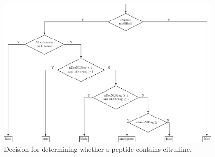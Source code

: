 \documentclass[12pt]{article}
\begin{document}
	\begin{figure}[h!]
		\centering
		\includegraphics[width=\textwidth]{containsCit_decision_tree.pdf}
		\caption{Decision for determining whether a peptide contains citrulline.}
		\label{fig:containsCit_tree}
	\end{figure}
	
\end{document}
